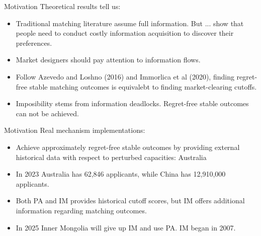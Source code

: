 \documentclass[dvipsnames,mathserif]{beamer}
\begin{document}
{\begin{frame}{Motivation}
Theoretical results tell us:
\vspace{0.5cm}
    \begin{itemize}
        \item Traditional matching literature assume full information. But ... show that people need to conduct costly information acquisition to discover their preferences.\\
        \item Market designers should pay attention to information flows.\\
        \item Follow Azevedo and Loshno (2016) and Immorlica et al (2020), finding regret-free stable matching outcomes is equivalebt to finding market-clearing cutoffs.\\
        \item Imposibility stems from information deadlocks. Regret-free stable outcomes can not be achieved.
    \end{itemize}
\end{frame}
\begin{frame}{Motivation}
Real mechanism implementations:
\vspace{0.5cm}
    \begin{itemize}
        \item Achieve approximately regret-free stable outcomes by providing external historical data with respect to perturbed capacities: Australia\\
        \item In 2023 Australia has 62,846 applicants, while China has 12,910,000 applicants. \\
        \item Both PA and IM provides historical cutoff scores, but IM offers additional information regarding matching outcomes.\\
        \item In 2025 Inner Mongolia will give up IM and use PA. IM began in 2007. 
    \end{itemize}
\end{frame}




}
\end{document}
